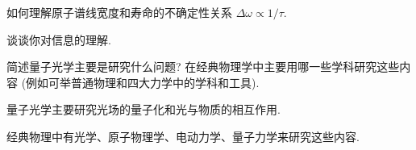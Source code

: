 \documentclass{assignment}
\begin{document}
\begin{prob}[附加题]
    如何理解原子谱线宽度和寿命的不确定性关系 $\Delta\omega\propto 1/\tau$.
\end{prob}
\begin{sol}
    
\end{sol}

\begin{prob}[附加题]
    谈谈你对信息的理解.
\end{prob}
\begin{sol}
    
\end{sol}

\begin{prob}[附加题]
    简述量子光学主要是研究什么问题? 在经典物理学中主要用哪一些学科研究这些内容 (例如可举普通物理和四大力学中的学科和工具).
\end{prob}
\begin{sol}
    量子光学主要研究光场的量子化和光与物质的相互作用.

    经典物理中有光学、原子物理学、电动力学、量子力学来研究这些内容.
\end{sol}
\end{document}
